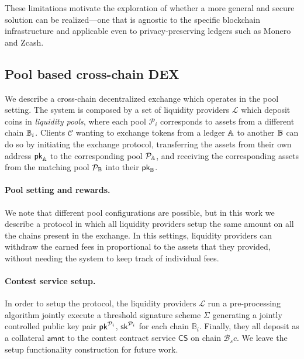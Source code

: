 These limitations motivate the exploration of whether a more general and secure solution can be realized—one that is agnostic to the specific blockchain infrastructure and applicable even to privacy-preserving ledgers such as Monero and Zcash.

\subsection{Pool based cross-chain DEX}
We describe a cross-chain decentralized exchange which operates in the pool setting.
The system is composed by a set of liquidity providers $\mathcal{L}$ which deposit coins in \textit{liquidity pools}, where each pool $\mathcal{P}_i$ corresponds to assets from a different chain $\mathbb{B}_i$.  Clients $\mathcal{C}$ wanting to exchange tokens from a ledger $\mathbb{A}$ to another $\mathbb{B}$ can do so by initiating the exchange protocol, transferring the assets from their own address $\mathsf{pk}_{\mathbb{A}}$ to the corresponding pool $\mathcal{P}_{\mathbb{A}}$, and receiving the corresponding assets from the matching pool $\mathcal{P}_{\mathbb{B}}$ into their $\mathsf{pk}_{\mathbb{B}}$. \

\paragraph*{Pool setting and rewards.}
We note that different pool configurations are possible, but in this work we describe a protocol in which all liquidity providers setup the same amount on all the chains present in the exchange. In this settings, liquidity providers can withdraw the earned fees in proportional to the assets that they provided, without needing the system to keep track of individual fees.

\paragraph*{Contest service setup.}
In order to setup the protocol, the liquidity providers $\mathcal{L}$ run a pre-processing algorithm jointly execute a threshold signature scheme $\Sigma$ generating a jointly controlled public key pair $\mathsf{pk}^{\mathcal{P}_i}$, $\mathsf{sk}^{\mathcal{P}_i}$ for each chain $\mathbb{B}_i$.
Finally, they all deposit as a collateral $\mathsf{amnt}$ to the contest contract service $\mathsf{CS}$ on chain $\mathcal{B}_sc$.
We leave the setup functionality construction for future work.

